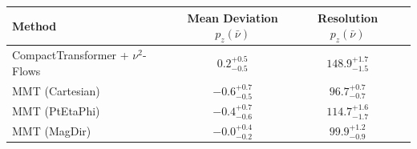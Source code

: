     \begin{tabular}{lccc}
        \toprule
        Method & Mean Deviation $p_{z}(\bar{\nu})$ & Resolution $p_{z}(\bar{\nu})$ \\
        \midrule
        CompactTransformer + $\nu^2$-Flows & $0.2^{+0.5}_{-0.5}$ & $148.9^{+1.7}_{-1.5}$ \\
        MMT (Cartesian) & $-0.6^{+0.7}_{-0.5}$ & $96.7^{+0.7}_{-0.7}$ \\
        MMT (PtEtaPhi) & $-0.4^{+0.7}_{-0.6}$ & $114.7^{+1.6}_{-1.7}$ \\
        MMT (MagDir) & $-0.0^{+0.4}_{-0.2}$ & $99.9^{+1.2}_{-0.9}$ \\
        \bottomrule
    \end{tabular}